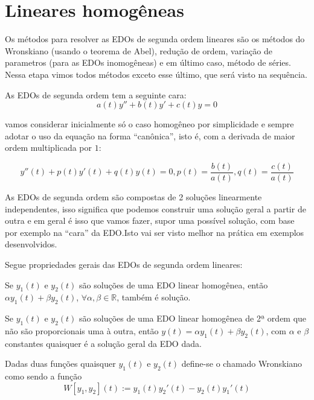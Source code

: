 \section{Lineares homogêneas}

Os métodos para resolver as EDOs de segunda ordem lineares são os métodos
do Wronskiano (usando o teorema de Abel), redução de ordem, variação de parametros (para
as EDOs inomogêneas) e em último caso, método de séries. Nessa etapa vimos todos métodos exceto esse
último, que será visto na sequência.

As EDOs de segunda ordem tem a seguinte cara:
\[ a(t) y'' + b(t) y' + c(t) y = 0  \]

vamos considerar inicialmente só o caso homogêneo por simplicidade e sempre
adotar o uso da equação na forma ``canônica'', isto é, com a derivada de maior ordem multiplicada
por \( 1 \):

\[ y''(t) + p(t) y'(t) + q(t) y(t) = 0, p(t) = \frac{b(t)}{a(t)}, q(t) = \frac{c(t)}{a(t)} \]


As EDOs de segunda ordem são compostas de 2 soluções linearmente independentes, isso significa que
podemos construir uma solução geral a partir de outra e em geral é isso que vamos fazer, supor uma
possível solução, com base por exemplo na ``cara'' da EDO.Isto vai ser visto melhor na prática em
exemplos desenvolvidos.

Segue propriedades gerais das EDOs de segunda ordem lineares:


\begin{theorem}
  Se \( y_1 (t)  \)  e \( y_2 (t) \) são soluções de uma EDO linear homogênea, então
  \( \alpha y_1 (t) + \beta y_2 (t) \), \( \forall \alpha , \beta  \in \mathbb{R} \), também é solução.
\end{theorem}

\begin{theorem}  
  Se \( y_1(t) \) e \( y_2 (t) \) são soluções de uma EDO linear homogênea de 2ª ordem que não
  são proporcionais uma à outra, então \( y(t) = \alpha y_1 (t) + \beta y_2 (t) \), com \( \alpha  \) e
  \( \beta  \) constantes quaisquer é a solução geral da EDO dada.
\end{theorem}


\begin{theorem}[Wronskiano]\label{teo:definicao_wronskiano}
  Dadas duas funções quaisquer \( y_1(t) \) e \( y_2(t) \) define-se o chamado
  Wronskiano como sendo a função
  \begin{equation}
    W[y_1, y_2] (t) := y_1 (t) y_2 '(t) - y_2 (t) y_1 ' (t)
    \label{eq:wronskiano_formula}
  \end{equation}
\end{theorem}

